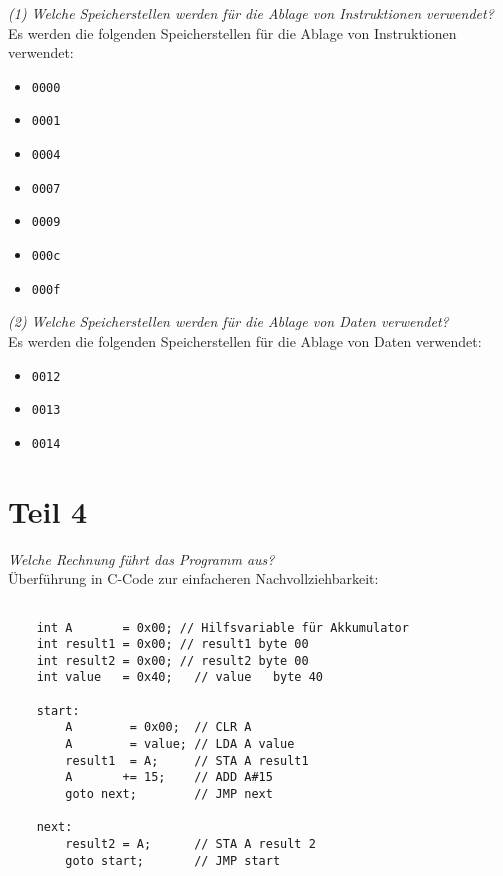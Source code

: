 \textit{(1) Welche Speicherstellen werden für die Ablage von Instruktionen
verwendet?}\\

\noindent
Es werden die folgenden Speicherstellen für die Ablage von Instruktionen verwendet:

\begin{itemize}
    \itemsep0.5em
    \item \texttt{0000}
    \item \texttt{0001}
    \item \texttt{0004}
    \item \texttt{0007}
    \item \texttt{0009}
    \item \texttt{000c}
    \item \texttt{000f}
\end{itemize}

\vspace{5mm}

\noindent
\textit{(2) Welche Speicherstellen werden für die Ablage von Daten verwendet?}\\

\noindent
Es werden die folgenden Speicherstellen für die Ablage von Daten verwendet:

\begin{itemize}
    \itemsep0.5em
    \item \texttt{0012}
    \item \texttt{0013}
    \item \texttt{0014}
\end{itemize}

\section{Teil 4}

\noindent
\textit{Welche Rechnung führt das Programm aus?}\\

\noindent
Überführung in C-Code zur einfacheren Nachvollziehbarkeit:

\begin{verbatim}

    int A       = 0x00; // Hilfsvariable für Akkumulator
    int result1 = 0x00; // result1 byte 00
    int result2 = 0x00; // result2 byte 00
    int value   = 0x40;   // value   byte 40

    start:
        A        = 0x00;  // CLR A
        A        = value; // LDA A value
        result1  = A;     // STA A result1
        A       += 15;    // ADD A#15
        goto next;        // JMP next

    next:
        result2 = A;      // STA A result 2
        goto start;       // JMP start
\end{verbatim}\\

